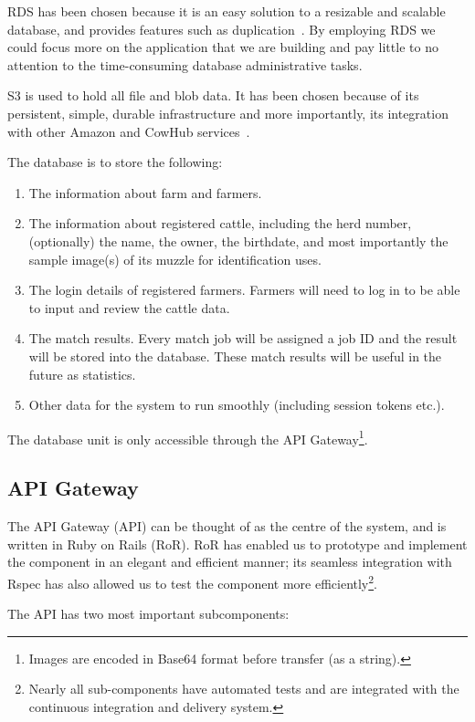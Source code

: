 RDS has been chosen because it is an easy solution to a resizable and scalable database, and provides features such as duplication~\cite{rds}. By employing RDS we could focus more on the application that we are building and pay little to no attention to the time-consuming database administrative tasks.

S3 is used to hold all file and blob data. It has been chosen because of its persistent, simple, durable infrastructure and more importantly, its integration with other Amazon and CowHub services~\cite{s3}.

The database is to store the following:

\begin{enumerate}
	\item The information about farm and farmers.
	\item The information about registered cattle, including the herd number, (optionally) the name, the owner, the birthdate, and most importantly the sample image(s) of its muzzle for identification uses.
	\item The login details of registered farmers. Farmers will need to log in to be able to input and review the cattle data.
	\item The match results. Every match job will be assigned a job ID and the result will be stored into the database. These match results will be useful in the future as statistics.
	\item Other data for the system to run smoothly (including session tokens etc.).
\end{enumerate}

The database unit is only accessible through the API Gateway\footnote{Images are encoded in Base64 format before transfer (as a string).}.

\subsection{API Gateway}
The API Gateway (API) can be thought of as the centre of the system, and is written in Ruby on Rails (RoR). RoR has enabled us to prototype and implement the component in an elegant and efficient manner; its seamless integration with Rspec has also allowed us to test the component more efficiently\footnote{Nearly all sub-components have automated tests and are integrated with the continuous integration and delivery system.}.

The API has two most important subcomponents:


